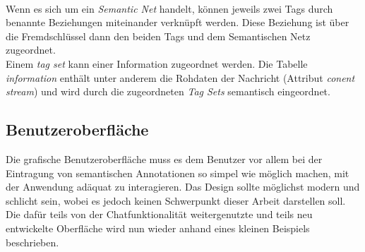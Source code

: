 \\Wenn es sich um ein \textit{Semantic Net} handelt, können jeweils zwei Tags durch benannte Beziehungen miteinander verknüpft werden. Diese Beziehung ist über die Fremdschlüssel dann den beiden Tags und dem Semantischen Netz zugeordnet. 
\\Einem \textit{tag set} kann einer Information zugeordnet werden. Die Tabelle \textit{information} enthält unter anderem die Rohdaten der Nachricht (Attribut \textit{conent stream}) und wird durch die zugeordneten \textit{Tag Sets} semantisch eingeordnet. 
\newline [...]

\subsection{Benutzeroberfläche}
Die grafische Benutzeroberfläche muss es dem Benutzer vor allem bei der Eintragung von semantischen Annotationen so simpel wie möglich machen, mit der Anwendung adäquat zu interagieren. Das Design sollte möglichst modern und schlicht sein, wobei es jedoch keinen Schwerpunkt dieser Arbeit darstellen soll. 
\\Die dafür teils von der Chatfunktionalität weitergenutzte und teils neu entwickelte Oberfläche wird nun wieder anhand eines kleinen Beispiels beschrieben. 
\newpage